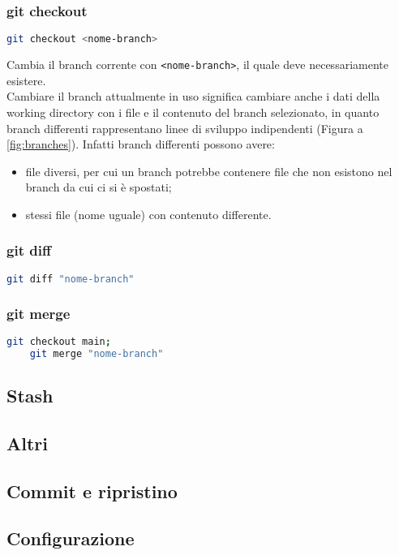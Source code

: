 \subsubsection{git checkout}
\begin{lstlisting}[language=bash]
	git checkout <nome-branch> 
\end{lstlisting}
Cambia il branch corrente con \texttt{<nome-branch>}, il quale deve necessariamente esistere.\\
Cambiare il branch attualmente in uso significa cambiare anche i dati della working directory con i file e il contenuto del branch selezionato, in quanto branch differenti rappresentano linee di sviluppo indipendenti (Figura a \ref{fig:branches}). Infatti branch differenti possono avere:
\begin{itemize}[noitemsep, topsep=3pt]
	\item file diversi, per cui un branch potrebbe contenere file che non esistono nel branch da cui ci si è spostati;
	\item stessi file (nome uguale) con contenuto differente.
\end{itemize}

\subsubsection{git diff}
\begin{lstlisting}[language=bash]
	git diff "nome-branch" 
\end{lstlisting}

\subsubsection{git merge}
\begin{lstlisting}[language=bash]
	git checkout main;
	git merge "nome-branch"
\end{lstlisting}



\subsection{Stash}



\subsection{Altri}


\subsection{Commit e ripristino}

\subsection{Configurazione}


